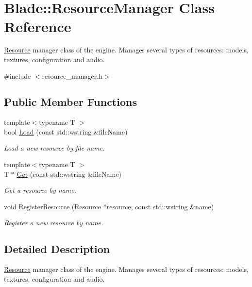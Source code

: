 \hypertarget{class_blade_1_1_resource_manager}{}\section{Blade\+:\+:Resource\+Manager Class Reference}
\label{class_blade_1_1_resource_manager}


\hyperlink{class_blade_1_1_resource}{Resource} manager class of the engine. Manages several types of resources\+: models, textures, configuration and audio.  




{\ttfamily \#include $<$resource\+\_\+manager.\+h$>$}

\subsection*{Public Member Functions}
\begin{DoxyCompactItemize}
\item 
{\footnotesize template$<$typename T $>$ }\\bool \hyperlink{class_blade_1_1_resource_manager_ad99695e0e3d6cf66e3645b61dcede9b8}{Load} (const std\+::wstring \&file\+Name)
\begin{DoxyCompactList}\small\item\em Load a new resource by file name. \end{DoxyCompactList}\item 
{\footnotesize template$<$typename T $>$ }\\T $\ast$ \hyperlink{class_blade_1_1_resource_manager_a84e678264f844a6b4bca8d46ee16336b}{Get} (const std\+::wstring \&file\+Name)
\begin{DoxyCompactList}\small\item\em Get a resource by name. \end{DoxyCompactList}\item 
void \hyperlink{class_blade_1_1_resource_manager_aa406f90716a7758669b424a290549256}{Register\+Resource} (\hyperlink{class_blade_1_1_resource}{Resource} $\ast$resource, const std\+::wstring \&name)
\begin{DoxyCompactList}\small\item\em Register a new resource by name. \end{DoxyCompactList}\end{DoxyCompactItemize}


\subsection{Detailed Description}
\hyperlink{class_blade_1_1_resource}{Resource} manager class of the engine. Manages several types of resources\+: models, textures, configuration and audio. 


